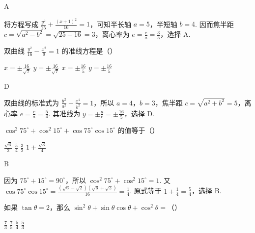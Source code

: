 \begin{answer}
A
\end{answer}

\begin{solution}
将方程写成 \(\frac{y^2}{25}+\frac{(x+1)^2}{16}=1\)，可知半长轴 \(a=5\)，半短轴 \(b=4\). 因而焦半距 \(c=\sqrt{a^2-b^2}=\sqrt{25-16}=3\)，离心率为 \(e=\frac{c}{a}=\frac{3}{5}\)，选择 A.
\end{solution}

\begin{problem}
双曲线 \(\frac{y^2}{16}-\frac{x^2}{9}=1\) 的准线方程是（\quad）

\choices
    {\(x=\pm \frac{16}{\sqrt{7}}\)}
    {\(y=\pm \frac{16}{\sqrt{7}}\)}
    {\(x=\pm \frac{16}{5}\)}
    {\(y=\pm \frac{16}{5}\)}
\end{problem}

\begin{answer}
D
\end{answer}

\begin{solution}
双曲线的标准式为 \(\frac{y^2}{a^2}-\frac{x^2}{b^2}=1\)，所以 \(a=4\)，\(b=3\)，焦半距 \(c=\sqrt{a^2+b^2}=5\)，离心率 \(e=\frac{c}{a}=\frac{5}{4}\). 其准线为 \(y=\pm\frac{a}{e}=\pm\frac{16}{5}\)，选择 D.
\end{solution}

\begin{problem}
\(\cos^2 75^\circ+\cos^2 15^\circ+\cos 75^\circ\cos 15^\circ\) 的值等于（\quad）

\choices
    {\(\frac{\sqrt{6}}{2}\)}
    {\(\frac{5}{4}\)}
    {\(\frac{3}{2}\)}
    {\(1+\frac{\sqrt{3}}{4}\)}
\end{problem}

\begin{answer}
B
\end{answer}

\begin{solution}
因为 \(75^{\circ}+15^{\circ}=90^{\circ}\)，所以 \(\cos^2 75^{\circ}+\cos^2 15^{\circ}=1\). 又
\(\cos75^{\circ}\cos15^{\circ}=\frac{(\sqrt{6}-\sqrt{2})(\sqrt{6}+\sqrt{2})}{16}=\frac{1}{4}\). 原式等于 \(1+\frac14=\frac54\)，选择 B.
\end{solution}

\begin{problem}
如果 \(\tan\theta=2\)，那么 \(\sin^2\theta+\sin\theta\cos\theta+\cos^2\theta=\)（\quad）

\choices
    {\(\frac{7}{3}\)}
    {\(\frac{7}{5}\)}
    {\(\frac{5}{4}\)}
    {\(\frac{5}{3}\)}
\end{problem}

